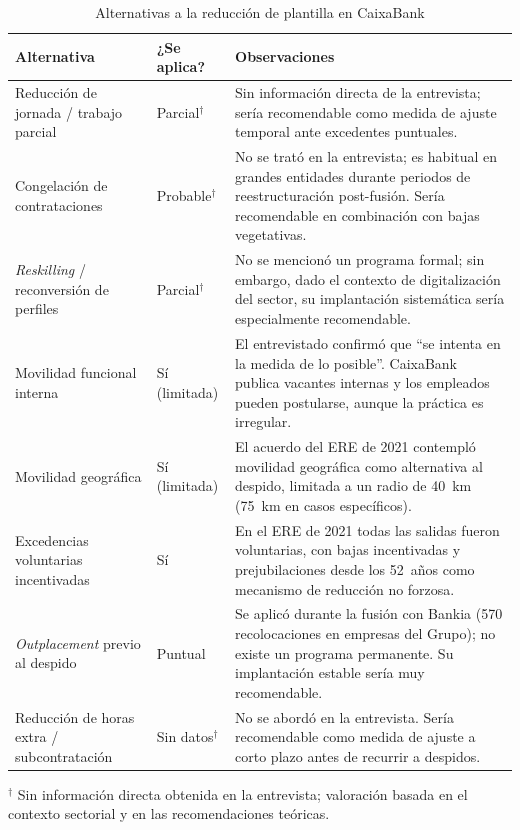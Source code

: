 \begin{table}[H]
  \centering
  \small
  \caption{Alternativas a la reducción de plantilla en CaixaBank}
  \begin{tabularx}{\textwidth}{p{} p{} X}
    \toprule
    \textbf{Alternativa}                        & \textbf{¿Se aplica?} & \textbf{Observaciones} \\
    \midrule
    Reducción de jornada / trabajo parcial       & Parcial$^\dagger$ & Sin información directa de la entrevista; sería recomendable como medida de ajuste temporal ante excedentes puntuales. \\
    Congelación de contrataciones                & Probable$^\dagger$ & No se trató en la entrevista; es habitual en grandes entidades durante periodos de reestructuración post-fusión. Sería recomendable en combinación con bajas vegetativas. \\
    \textit{Reskilling} / reconversión de perfiles & Parcial$^\dagger$ & No se mencionó un programa formal; sin embargo, dado el contexto de digitalización del sector, su implantación sistemática sería especialmente recomendable. \\
    Movilidad funcional interna                  & Sí (limitada) & El entrevistado confirmó que ``se intenta en la medida de lo posible''. CaixaBank publica vacantes internas y los empleados pueden postularse, aunque la práctica es irregular. \\
    Movilidad geográfica                         & Sí (limitada) & El acuerdo del ERE de 2021 contempló movilidad geográfica como alternativa al despido, limitada a un radio de 40~km (75~km en casos específicos). \\
    Excedencias voluntarias incentivadas         & Sí & En el ERE de 2021 todas las salidas fueron voluntarias, con bajas incentivadas y prejubilaciones desde los 52~años como mecanismo de reducción no forzosa. \\
    \textit{Outplacement} previo al despido      & Puntual & Se aplicó durante la fusión con Bankia (570 recolocaciones en empresas del Grupo); no existe un programa permanente. Su implantación estable sería muy recomendable. \\
    Reducción de horas extra / subcontratación   & Sin datos$^\dagger$ & No se abordó en la entrevista. Sería recomendable como medida de ajuste a corto plazo antes de recurrir a despidos. \\
    \bottomrule
  \end{tabularx}
  \par\smallskip
  \footnotesize $^\dagger$ Sin información directa obtenida en la entrevista;
  valoración basada en el contexto sectorial y en las recomendaciones teóricas.
\end{table}

